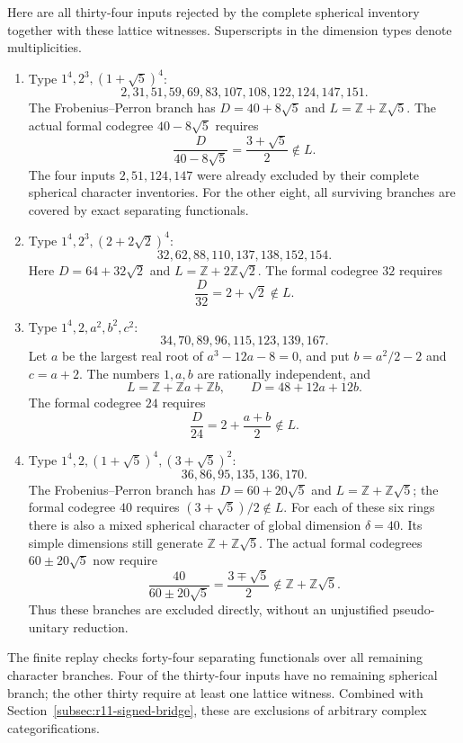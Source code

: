Here are all thirty-four inputs rejected by the complete spherical
inventory together with these lattice witnesses. Superscripts in the
dimension types denote multiplicities.
\begin{enumerate}
\item Type $1^4,2^3,(1+\sqrt5)^4$:
\[
 2,31,51,59,69,83,107,108,122,124,147,151.
\]
The Frobenius--Perron branch has
$D=40+8\sqrt5$ and $L=\mathbb Z+\mathbb Z\sqrt5$.
The actual formal codegree $40-8\sqrt5$ requires
\[
 \frac{D}{40-8\sqrt5}=\frac{3+\sqrt5}{2}\notin L.
\]
The four inputs $2,51,124,147$ were already excluded by their complete
spherical character inventories. For the other eight, all surviving
branches are covered by exact separating functionals.

\item Type $1^4,2^3,(2+2\sqrt2)^4$:
\[
 32,62,88,110,137,138,152,154.
\]
Here $D=64+32\sqrt2$ and $L=\mathbb Z+2\mathbb Z\sqrt2$.
The formal codegree $32$ requires
\[
 \frac{D}{32}=2+\sqrt2\notin L.
\]

\item Type $1^4,2,a^2,b^2,c^2$:
\[
 34,70,89,96,115,123,139,167.
\]
Let $a$ be the largest real root of $a^3-12a-8=0$, and put
$b=a^2/2-2$ and $c=a+2$.
The numbers $1,a,b$ are rationally independent, and
\[
 L=\mathbb Z+\mathbb Za+\mathbb Zb,
 \qquad D=48+12a+12b.
\]
The formal codegree $24$ requires
\[
 \frac{D}{24}=2+\frac{a+b}{2}\notin L.
\]

\item Type $1^4,2,(1+\sqrt5)^4,(3+\sqrt5)^2$:
\[
 36,86,95,135,136,170.
\]
The Frobenius--Perron branch has $D=60+20\sqrt5$ and
$L=\mathbb Z+\mathbb Z\sqrt5$; the formal codegree $40$ requires
$(3+\sqrt5)/2\notin L$.
For each of these six rings there is also a mixed spherical character
of global dimension $\delta=40$. Its simple dimensions still generate
$\mathbb Z+\mathbb Z\sqrt5$. The actual formal codegrees
$60\pm20\sqrt5$ now require
\[
 \frac{40}{60\pm20\sqrt5}=\frac{3\mp\sqrt5}{2}
 \notin\mathbb Z+\mathbb Z\sqrt5.
\]
Thus these branches are excluded directly, without an unjustified
pseudo-unitary reduction.
\end{enumerate}

The finite replay checks forty-four separating functionals over all
remaining character branches. Four of the thirty-four inputs have no
remaining spherical branch; the other thirty require at least one lattice
witness. Combined with Section~\ref{subsec:r11-signed-bridge}, these are
exclusions of arbitrary complex categorifications.

